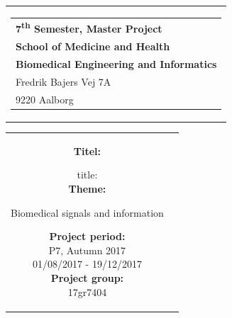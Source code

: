 % 
\thispagestyle{empty}
\begin{titlepage}
\begin{nopagebreak}
{\samepage 

\begin{tabular}{r}
\parbox{\textwidth}{  
\hfill \hspace{2cm} \parbox{8cm}{\begin{tabular}{l} %
{\small \textbf{\textcolor{aaublue}{{7\textsuperscript{th} Semester, Master Project}}}}\\
{\small \textbf{\textcolor{aaublue}{School of Medicine and Health}}}\\
{\small \textbf{\textcolor{aaublue}{Biomedical Engineering and Informatics}}}\\
{\small \textcolor{aaublue}{Fredrik Bajers Vej 7A}} \\
{\small \textcolor{aaublue}{9220 Aalborg}} \\
\end{tabular}}}
\end{tabular}

\begin{tabular}{cc}
\parbox{7cm}{

\textbf{Titel:}

title:\\ 

\textbf{Theme:}

\small{
Biomedical signals and information\\
}


\parbox{8cm}{


\textbf{Project period:}\\
P7, Autumn 2017\\
01/08/2017 - 19/12/2017\\
   
\textbf{Project group:}\\
17gr7404\\ %
  
}}
\end{tabular}}
\end{nopagebreak}
\end{titlepage}
